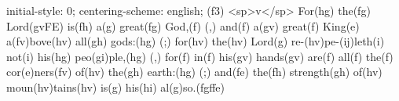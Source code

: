 initial-style: 0;
centering-scheme: english;
(f3) <sp>v</sp> For(hg) the(fg) Lord(gvFE) is(fh) a(g) great(fg) God,(f) (,) and(f) a(gv) great(f) King(e) a(fv)bove(hv) all(gh) gods:(hg) (;) for(hv) the(hv) Lord(g) re-(hv)pe-(ij)leth(i) not(i) his(hg) peo(gi)ple,(hg) (,) for(f) in(f) his(gv) hands(gv) are(f) all(f) the(f) cor(e)ners(fv) of(hv) the(gh) earth:(hg) (;) and(fe) the(fh) strength(gh) of(hv) moun(hv)tains(hv) is(g) his(hi) al(g)so.(fgffe)
